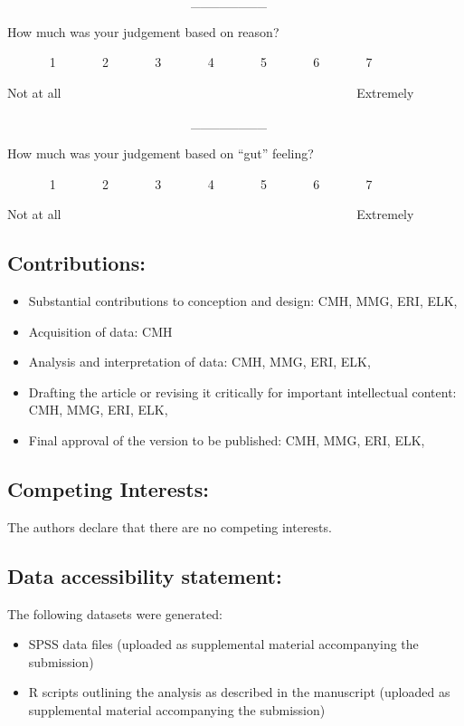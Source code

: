 ~~~~~~~~~~~~~~~~~~~~~~~~~~~~~\_\_\_\_\_\_\_\_

How much was your judgement based on reason?

~~~~~~ 1 ~~~~~~ 2 ~~~~~~ 3 ~~~~~~ 4 ~~~~~~ 5 ~~~~~~ 6 ~~~~~~ 7

Not at all ~~~~~~~~~~~~~~~~~~~~~~~~~~~~~~~~~~~~~~~~~~~~~~Extremely

~~~~~~~~~~~~~~~~~~~~~~~~~~~~~\_\_\_\_\_\_\_\_

How much was your judgement based on ``gut'' feeling?

~~~~~~ 1 ~~~~~~ 2 ~~~~~~ 3 ~~~~~~ 4 ~~~~~~ 5 ~~~~~~ 6 ~~~~~~ 7

Not at all ~~~~~~~~~~~~~~~~~~~~~~~~~~~~~~~~~~~~~~~~~~~~~~Extremely

\newpage

\subsection{Contributions:}\label{contributions}

\begin{itemize}
\tightlist
\item
  Substantial contributions to conception and design: CMH, MMG, ERI,
  ELK,
\item
  Acquisition of data: CMH
\item
  Analysis and interpretation of data: CMH, MMG, ERI, ELK,
\item
  Drafting the article or revising it critically for important
  intellectual content: CMH, MMG, ERI, ELK,
\item
  Final approval of the version to be published: CMH, MMG, ERI, ELK,
\end{itemize}

\subsection{Competing Interests:}\label{competing-interests}

The authors declare that there are no competing interests.

\subsection{Data accessibility
statement:}\label{data-accessibility-statement}

The following datasets were generated:

\begin{itemize}
\item
  SPSS data files (uploaded as supplemental material accompanying the
  submission)
\item
  R scripts outlining the analysis as described in the manuscript
  (uploaded as supplemental material accompanying the submission)
\end{itemize}
